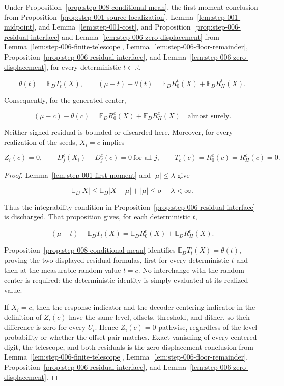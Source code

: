 \begin{proposition}\label{prop:step-008-target-interface}
Under Proposition~\ref{prop:step-008-conditional-mean}, the first-moment conclusion from Proposition~\ref{prop:step-001-source-localization}, Lemma~\ref{lem:step-001-midpoint}, and Lemma~\ref{lem:step-001-cost}, and Proposition~\ref{prop:step-006-residual-interface} and Lemma~\ref{lem:step-006-zero-displacement} from Lemma~\ref{lem:step-006-finite-telescope}, Lemma~\ref{lem:step-006-floor-remainder}, Proposition~\ref{prop:step-006-residual-interface}, and Lemma~\ref{lem:step-006-zero-displacement}, for every deterministic \(t\in\mathbb R\),

\[
\theta(t)=\mathbb E_DT_t(X),
\qquad
(\mu-t)-\theta(t)
=\mathbb E_D R_0^t(X)+\mathbb E_D R_H^t(X).
\]

Consequently, for the generated center,

\[
\boxed{
(\mu-c)-\theta(c)
=\mathbb E_D R_0^c(X)+\mathbb E_D R_H^c(X)
}
\quad\text{almost surely}.
\]

Neither signed residual is bounded or discarded here. Moreover, for every realization of the seeds, \(X_i=c\) implies

\[
Z_i(c)=0,
\qquad
D_j^c(X_i)-D_j^c(c)=0\ \text{for all }j,
\qquad
T_c(c)=R_0^c(c)=R_H^c(c)=0.
\]
\end{proposition}

\begin{proof}
Lemma~\ref{lem:step-001-first-moment} and \(|\mu|\leq\lambda\) give

\[
\mathbb E_D|X|
\leq\mathbb E_D|X-\mu|+|\mu|
\leq\sigma+\lambda<\infty.
\]

Thus the integrability condition in Proposition~\ref{prop:step-006-residual-interface} is discharged. That proposition gives, for each deterministic \(t\),

\[
(\mu-t)-\mathbb E_DT_t(X)
=\mathbb E_D R_0^t(X)+\mathbb E_D R_H^t(X).
\]

Proposition~\ref{prop:step-008-conditional-mean} identifies \(\mathbb E_DT_t(X)=\theta(t)\), proving the two displayed residual formulas, first for every deterministic \(t\) and then at the measurable random value \(t=c\). No interchange with the random center is required: the deterministic identity is simply evaluated at its realized value.

If \(X_i=c\), then the response indicator and the decoder-centering indicator in the definition of \(Z_i(c)\) have the same level, offsets, threshold, and dither, so their difference is zero for every \(U_i\). Hence \(Z_i(c)=0\) pathwise, regardless of the level probability or whether the offset pair matches. Exact vanishing of every centered digit, the telescope, and both residuals is the zero-displacement conclusion from Lemma~\ref{lem:step-006-finite-telescope}, Lemma~\ref{lem:step-006-floor-remainder}, Proposition~\ref{prop:step-006-residual-interface}, and Lemma~\ref{lem:step-006-zero-displacement}.
\end{proof}

